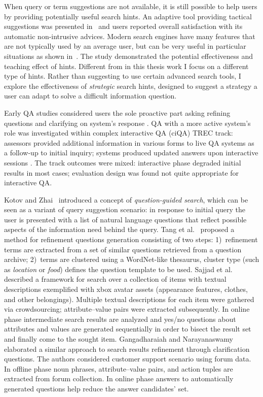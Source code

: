 When query or term suggestions are not available, it is still possible to help users by providing potentially useful search hints.
An adaptive tool providing tactical suggestions was presented in~\cite{Kriewel2010} and users reported overall satisfaction with its automatic non-intrusive advices.
Modern search engines have many features that are not typically used by an average user, but can be very useful in particular situations as shown in~\cite{Moraveji:2011:MIU:2009916.2009966}. The study demonstrated the potential effectiveness and teaching effect of hints.
Different from \cite{Moraveji:2011:MIU:2009916.2009966} in this thesis work I focus on a different type of hints.
Rather than suggesting to use certain advanced search tools, I explore the effectiveness of \textit{strategic} search hints, designed to suggest a strategy a user can adapt to solve a difficult information question.

Early QA studies considered users the sole proactive part asking refining questions and clarifying on system's response \cite{deboni2005}.
QA with a more active system's role was investigated within complex interactive QA (ciQA) TREC track: assessors provided additional information in various forms to live QA systems as a follow-up to initial inquiry; systems produced updated answers upon interactive sessions \cite{trec2007}.
The track outcomes were mixed: interactive phase degraded initial results in most cases; evaluation design was found not quite appropriate for interactive QA.

Kotov and Zhai~\cite{kotov2010} introduced a concept of \textit{question-guided search}, which can be seen as a variant of query suggestion scenario: in response to initial query the user is presented with a list of natural language questions that reflect possible aspects of the information need behind the query.
Tang et al.~\cite{tang2011} proposed a method for refinement questions generation consisting of two steps: 1)~refinement terms are extracted from a set of similar questions retrieved from a question archive; 2)~terms are  clustered using a WordNet-like thesaurus, cluster type (such as \textit{location} or \textit{food}) defines the question template to be used.
Sajjad et al.~\cite{sajjad12} described a framework for search over a collection of items with textual descriptions exemplified with xbox avatar assets (appearance features, clothes, and other belongings).
Multiple textual descriptions for each item were gathered via crowdsourcing; attribute--value pairs were extracted subsequently.
In online phase intermediate search results are analyzed and yes/no questions about attributes and values are generated sequentially in order to bisect the result set and finally come to the sought item.
Gangadharaiah and Narayanaswamy~\cite{gangadharaiah2013} elaborated a similar approach to search results refinement through clarification questions.
The authors considered customer support scenario using forum data.
In offline phase noun phrases, attribute--value pairs, and action tuples are extracted from forum collection.
In online phase answers to automatically generated questions help reduce the answer candidates' set.

